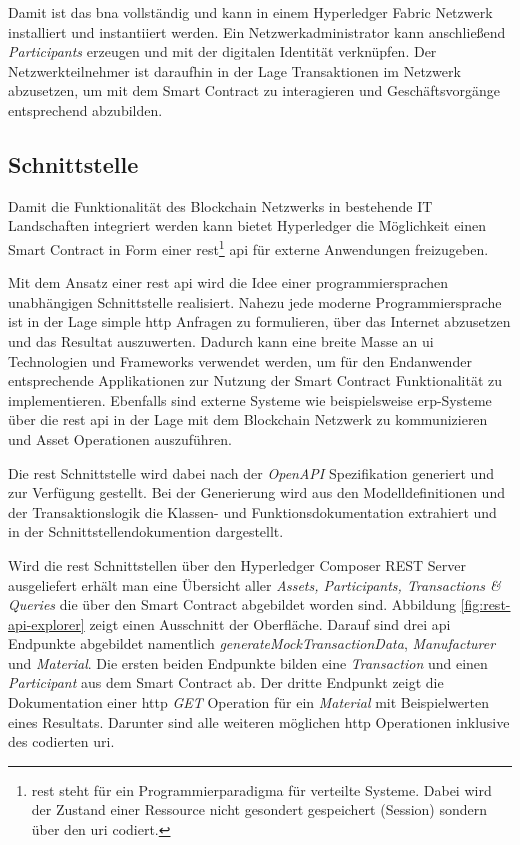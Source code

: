 \noindent
Damit ist das \acf{bna} vollständig und kann in einem Hyperledger Fabric Netzwerk installiert und instantiiert werden. Ein Netzwerkadministrator kann anschließend \textit{Participants} erzeugen und mit der digitalen Identität verknüpfen. Der Netzwerkteilnehmer ist daraufhin in der Lage Transaktionen im Netzwerk abzusetzen, um mit dem Smart Contract zu interagieren und Geschäftsvorgänge entsprechend abzubilden.

\subsection{Schnittstelle}
Damit die Funktionalität des Blockchain Netzwerks in bestehende IT Landschaften integriert werden kann bietet Hyperledger die Möglichkeit einen Smart Contract in Form einer \acs{rest}\footnote{\acf{rest} steht für ein Programmierparadigma für verteilte Systeme. Dabei wird der Zustand einer Ressource nicht gesondert gespeichert (Session) sondern über den \ac{uri} codiert.} \acs{api} für externe Anwendungen freizugeben.

Mit dem Ansatz einer \ac{rest} \ac{api} wird die Idee einer programmiersprachen unabhängigen Schnittstelle realisiert. Nahezu jede moderne Programmiersprache ist in der Lage simple \ac{http} Anfragen zu formulieren, über das Internet abzusetzen und das Resultat auszuwerten. Dadurch kann eine breite Masse an \ac{ui} Technologien und Frameworks verwendet werden, um für den Endanwender entsprechende Applikationen zur Nutzung der Smart Contract Funktionalität zu implementieren. Ebenfalls sind externe Systeme wie beispielsweise \ac{erp}-Systeme über die \ac{rest} \ac{api} in der Lage mit dem Blockchain Netzwerk zu kommunizieren und Asset Operationen auszuführen.

Die \ac{rest} Schnittstelle wird dabei nach der \textit{OpenAPI} Spezifikation \citep[siehe][]{OAI2018} generiert und zur Verfügung gestellt. Bei der Generierung wird aus den Modelldefinitionen und der Transaktionslogik die Klassen- und Funktionsdokumentation extrahiert und in der Schnittstellendokumention dargestellt.

Wird die \ac{rest} Schnittstellen über den Hyperledger Composer REST Server ausgeliefert erhält man eine Übersicht aller \textit{Assets, Participants, Transactions \& Queries} die über den Smart Contract abgebildet worden sind. Abbildung \ref{fig:rest-api-explorer} zeigt einen Ausschnitt der Oberfläche. Darauf sind drei \ac{api} Endpunkte abgebildet namentlich \textit{generateMockTransactionData}, \textit{Manufacturer} und \textit{Material}. Die ersten beiden Endpunkte bilden eine \textit{Transaction} und einen \textit{Participant} aus dem Smart Contract ab. Der dritte Endpunkt zeigt die Dokumentation einer \ac{http} \textit{GET} Operation für ein \textit{Material} mit Beispielwerten eines Resultats. Darunter sind alle weiteren möglichen \ac{http} Operationen inklusive des codierten \ac{uri}.

